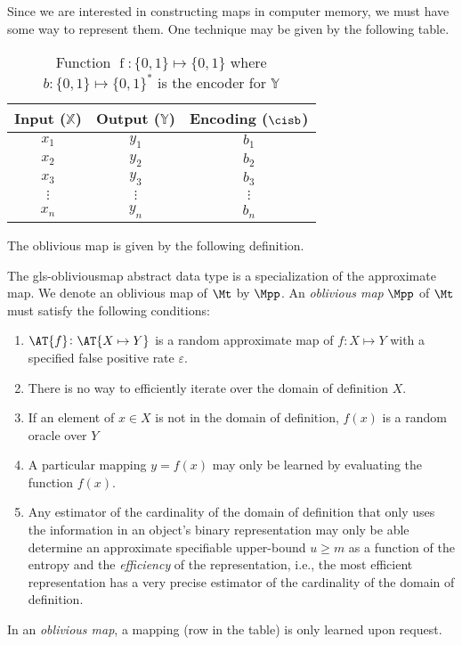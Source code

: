\documentclass[ ../main.tex]{subfiles}
\begin{document}
Since we are interested in constructing maps in computer memory, we must have some way to represent them.
One technique may be given by the following table.

\begin{table}
\centering
\caption{Function $\operatorname{f} \colon \{0,1\} \mapsto \{0,1\}$ where $b : \{0,1\} \mapsto \{0,1\}^*$ is the encoder for $\mathbb{Y}$}
\label{tbl:tabfunc}
\begin{tabular}{|c c c|} 
\hline
Input ($\mathbb{X}$) & Output ($\mathbb{Y}$) & Encoding ($\cisb$)\\
\hline
    $x_1$ & $y_1$ & $b_1$\\
    $x_2$ & $y_2$ & $b_2$\\
    $x_3$ & $y_3$ & $b_3$\\
    $\vdots$ & $\vdots$ & $\vdots$\\
    $x_n$ & $y_n$ & $b_n$\\
\hline
\end{tabular}
\end{table}



The oblivious map is given by the following definition.
\begin{definition}
The \gls{gls-obliviousmap} abstract data type is a specialization of the approximate map. We denote an oblivious map of $\Mt$ by $\Mpp$. An \emph{oblivious map} $\Mpp$ of $\Mt$ must satisfy the following conditions:
\begin{enumerate}
    \item $\AT{f} \colon \AT{X \mapsto Y}$ is a random approximate map of $f \colon X \mapsto Y$ with a specified false positive rate $\varepsilon$.
    \item There is no way to efficiently iterate over the domain of definition $X$.
    \item If an element of $x \in X$ is not in the domain of definition, $f(x)$ is a random oracle over $Y$
    \item A particular mapping $y = f(x)$ may only be learned by evaluating the function $f(x)$.
    \item Any estimator of the cardinality of the domain of definition that only uses the information in an object's binary representation may only be able determine an approximate specifiable upper-bound $u \geq m$ as a function of the entropy and the \emph{efficiency} of the representation, i.e., the most efficient representation has a very precise estimator of the cardinality of the domain of definition.
\end{enumerate}
\end{definition}
In an \emph{oblivious map}, a mapping (row in the table) is only learned upon request.
\end{document}
